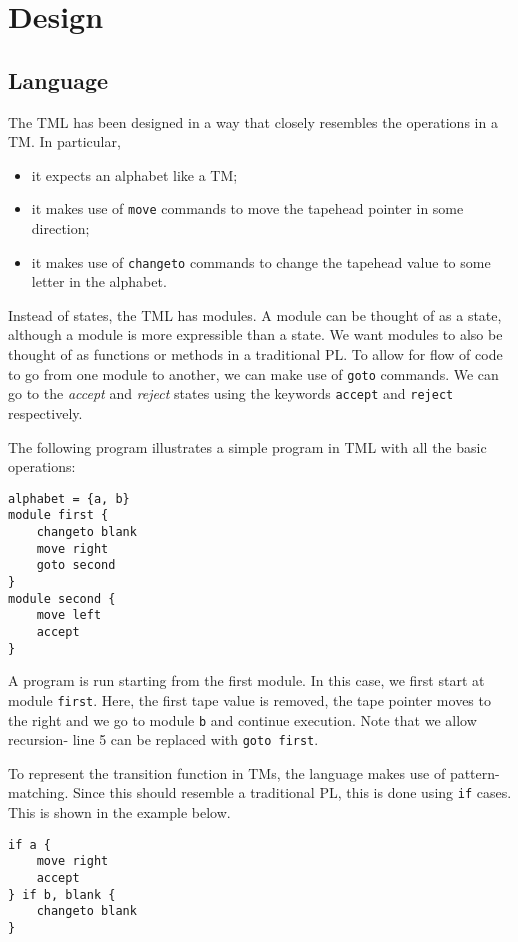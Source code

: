 \chapter{Design}
\section{Language}

The TML has been designed in a way that closely resembles the operations in a TM. In particular, 
\begin{itemize}
    \item it expects an alphabet like a TM;
    \item it makes use of \texttt{move} commands to move the tapehead pointer in some direction;
    \item it makes use of \texttt{changeto} commands to change the tapehead value to some letter in the alphabet.
\end{itemize}
Instead of states, the TML has modules. A module can be thought of as a state, although a module is more expressible than a state. We want modules to also be thought of as functions or methods in a traditional PL. To allow for flow of code to go from one module to another, we can make use of \texttt{goto} commands. We can go to the \textit{accept} and \textit{reject} states using the keywords \texttt{accept} and \texttt{reject} respectively.

The following program illustrates a simple program in TML with all the basic operations:
\begin{lstlisting}[language=TML]
alphabet = {a, b}
module first {
    changeto blank
    move right
    goto second
}
module second {
    move left
    accept
}
\end{lstlisting}
A program is run starting from the first module. In this case, we first start at module \texttt{first}. Here, the first tape value is removed, the tape pointer moves to the right and we go to module \texttt{b} and continue execution. Note that we allow recursion- line 5 can be replaced with \texttt{goto first}.

To represent the transition function in TMs, the language makes use of pattern-matching. Since this should resemble a traditional PL, this is done using \texttt{if} cases. This is shown in the example below.
\begin{lstlisting}[language=TML]
if a {
    move right
    accept
} if b, blank {
    changeto blank
}
\end{lstlisting}

